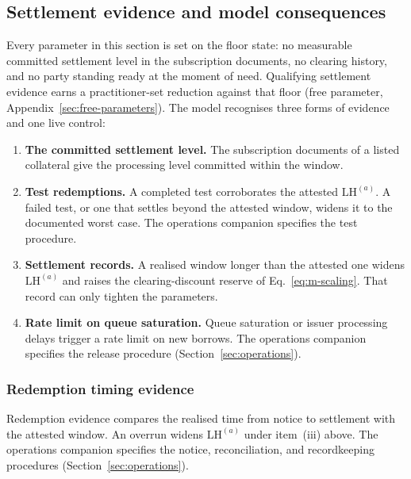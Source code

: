 \subsection{Settlement evidence and model consequences}\label{sec:warehouse-ops}
Every parameter in this section is set on the floor state: no measurable committed
settlement level in the subscription documents, no clearing history, and no party standing
ready at the moment of need. Qualifying settlement evidence earns a practitioner-set reduction against that floor (free parameter, Appendix~\ref{sec:free-parameters}). The model recognises three forms of evidence and one live control:
\begin{enumerate}[label=(\roman*),itemsep=1pt]
\item \textbf{The committed settlement level.} The subscription documents of a listed
collateral give the processing level committed within the window.
\item \textbf{Test redemptions.} A completed test corroborates the attested $\mathrm{LH}^{(a)}$. A failed test, or one that settles beyond the attested window, widens it to the documented worst case. The operations companion specifies the test procedure.
\item \textbf{Settlement records.} A realised window longer than the attested one widens $\mathrm{LH}^{(a)}$ and raises the clearing-discount
reserve of Eq.~\eqref{eq:m-scaling}. That record can only tighten the parameters.
\item \textbf{Rate limit on queue saturation.} Queue saturation or issuer processing delays trigger a rate limit on new borrows. The operations companion specifies the release procedure (Section~\ref{sec:operations}).
\end{enumerate}

\subsubsection{Redemption timing evidence}\label{sec:redemption-ops}
Redemption evidence compares the realised time from notice to settlement with the attested window. An overrun widens $\mathrm{LH}^{(a)}$ under item~(iii) above. The operations companion specifies the notice, reconciliation, and recordkeeping procedures (Section~\ref{sec:operations}).
